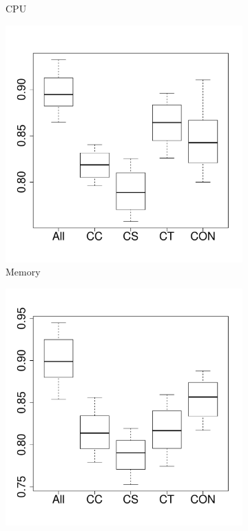\begin{figure}[t]
\begin{subfigure}{0.19\textwidth}
                \caption{CPU}
        \end{subfigure}%
        \begin{subfigure}{0.19\textwidth}
                \includegraphics[width=\linewidth]{Figures/mem-hadoopkeep-importance.pdf}
                \caption{Memory}
        \end{subfigure}%
        \begin{subfigure}{0.19\textwidth}
                \includegraphics[width=\linewidth]{Figures/ioread-hadoopkeep-importance.pdf}

\end{subfigure}
\end{figure}

